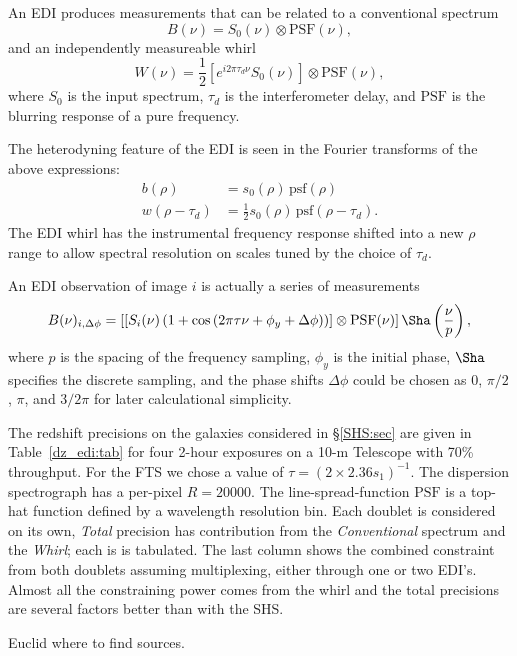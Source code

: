 \documentclass[preprint]{aastex}
\begin{document}
An EDI produces measurements that can be related
to a conventional spectrum
\begin{equation}
B(\nu) = S_0(\nu) \otimes \mbox{PSF}(\nu),
\end{equation}
and an independently measureable whirl
\begin{equation}
W(\nu) = \frac{1}{2}\left[e^{i2\pi\tau_d\nu}S_0(\nu)\right] \otimes \mbox{PSF}(\nu),
\end{equation}
where $S_0$ is the input spectrum, $\tau_d$ is the interferometer delay, and $\mbox{PSF}$  is the blurring
response of a pure frequency.

The heterodyning feature of the EDI is seen in the Fourier transforms of the above expressions:
\begin{align}
b(\rho) & =s_0(\rho) \, \mbox{psf}(\rho)\\
w(\rho -\tau_d) & =\frac{1}{2} s_0(\rho) \, \mbox{psf}(\rho-\tau_d).
\end{align}
The EDI whirl has the instrumental frequency response shifted into a new $\rho$ range to allow
spectral
resolution on scales tuned by the choice of $\tau_d$.

An EDI observation of image $i$ is actually a series of measurements
\begin{equation}
B(\nu)_{i,\Delta\phi} = \left[\left[S_i(\nu)\left(1+\cos{\left(2\pi\tau\nu+\phi_y+\Delta\phi \right)} \right)\right]\otimes \mbox{PSF}(\nu)\right]\Sha\left(\frac{\nu}{p}\right),
\end{equation}
where $p$ is the spacing of the frequency sampling, $\phi_y$ is the initial phase, $\Sha$ specifies the discrete sampling,
and the phase shifts $\Delta\phi$ could be chosen as
$0$, $\pi/2$, $\pi$, and $3/2\pi$ for later calculational simplicity.

The redshift precisions on the galaxies considered in \S\ref{SHS:sec} are given in Table~\ref{dz_edi:tab}
for four 2-hour exposures on a 10-m Telescope with 70\% throughput.  For the FTS we
chose a value of $\tau=(2\times2.36 s_1)^{-1}$.
The dispersion spectrograph has a per-pixel $R=20000$.  The line-spread-function $\mbox{PSF}$ is a top-hat function defined by a wavelength
resolution bin.  Each doublet is considered on its own, {\it Total} precision has contribution from the {\it Conventional} spectrum and the {\it Whirl}; each is
is tabulated.  The last column shows the combined constraint from both doublets assuming multiplexing, either through one or two EDI's.
Almost all the constraining power comes from the whirl and the total precisions are several factors better than with the SHS.


Euclid where to find sources.



\end{document}
